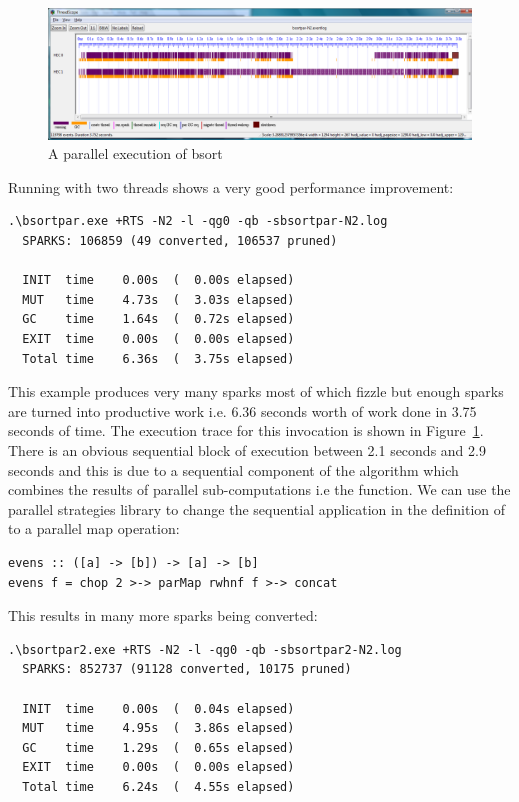 \begin{figure}
\begin{center}
\includegraphics[width=17cm]{bsortpar-n2.png}
\end{center}
\caption{A parallel execution of bsort}
\label{f:bsortpar-n2}
\end{figure}

 Running with two threads shows a very good performance improvement:

\begin{verbatim}
.\bsortpar.exe +RTS -N2 -l -qg0 -qb -sbsortpar-N2.log
  SPARKS: 106859 (49 converted, 106537 pruned)

  INIT  time    0.00s  (  0.00s elapsed)
  MUT   time    4.73s  (  3.03s elapsed)
  GC    time    1.64s  (  0.72s elapsed)
  EXIT  time    0.00s  (  0.00s elapsed)
  Total time    6.36s  (  3.75s elapsed)
\end{verbatim}

This example produces very many sparks most of which fizzle but enough sparks are turned into productive work i.e. 6.36 seconds worth of work done in 3.75 seconds of time. The execution trace for this invocation is shown in Figure~\ref{f:bsortpar-n2}. 
There is an obvious sequential block of execution between 2.1 seconds and 2.9 seconds and this is due to a sequential component of the algorithm which combines the results of parallel sub-computations i.e the  function. We can use the parallel strategies library to change the sequential application in the definition of  to a parallel map operation:

\begin{lstlisting}
evens :: ([a] -> [b]) -> [a] -> [b]
evens f = chop 2 >-> parMap rwhnf f >-> concat
\end{lstlisting}

This results in many more sparks being converted:

\begin{verbatim}
.\bsortpar2.exe +RTS -N2 -l -qg0 -qb -sbsortpar2-N2.log
  SPARKS: 852737 (91128 converted, 10175 pruned)

  INIT  time    0.00s  (  0.04s elapsed)
  MUT   time    4.95s  (  3.86s elapsed)
  GC    time    1.29s  (  0.65s elapsed)
  EXIT  time    0.00s  (  0.00s elapsed)
  Total time    6.24s  (  4.55s elapsed)
\end{verbatim}

